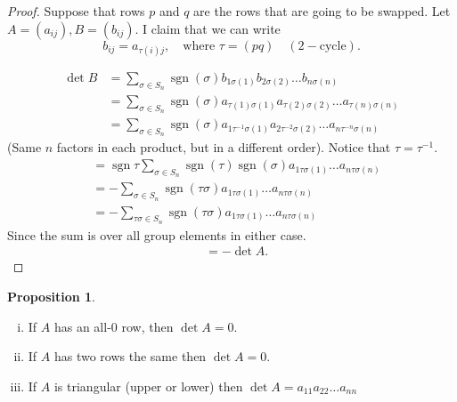 \documentclass{article}
\theoremstyle{definition} \newtheorem*{definition}{Definition}
\newtheorem{proposition}[theorem]{Proposition}
\DeclareMathOperator{\sgn}{sgn} \DeclareMathOperator{\id}{id}
\begin{document}
  \begin{proof} Suppose that rows $p$ and $q$ are the rows that are going to be
    swapped. Let $A=(a_{ij}),B=(b_{ij})$. I claim that we can write \[ b_{ij} =
    a_{\tau (i) j}, \quad\text{where }\tau = (pq) \quad (2-\text{cycle}).\]

      \begin{align*} \det B &= \sum_{\sigma \in S_n} \sgn(\sigma)
        b_{1\sigma(1)}b_{2\sigma (2)}\dots b_{n \sigma (n)}\\ &= \sum_{\sigma
        \in S_n} \sgn(\sigma) a_{\tau(1)\sigma(1)}a_{\tau(2)\sigma (2)}\dots
        a_{\tau(n) \sigma (n)}\\ &= \sum_{\sigma \in S_n} \sgn(\sigma)
        a_{1\tau^{-1}\sigma(1)}a_{2\tau^{-2}\sigma (2)}\dots a_{n\tau^{-n}
      \sigma (n)} \end{align*} (Same $n$ factors in each product, but in a
    different order). Notice that $\tau = \tau^{-1}$.  \begin{align*} &=
      \sgn{\tau} \sum_{\sigma \in
      S_n}\sgn(\tau)\sgn(\sigma)a_{1\tau\sigma(1)}\dots a_{n \tau\sigma(n)} \\
      &= - \sum_{\sigma \in S_n}\sgn(\tau\sigma)a_{1\tau\sigma(1)}\dots a_{n
      \tau\sigma(n)} \\ &= - \sum_{\tau\sigma \in
      S_n}\sgn(\tau\sigma)a_{1\tau\sigma(1)}\dots a_{n \tau\sigma(n)}
    \end{align*} Since the sum is over all group elements in either case.
    \begin{align*} &= -\det A.  \end{align*} \end{proof}

  \begin{proposition}\hfill \label{prp:rowssame} \begin{enumerate}[(i)] \item If $A$
          has an all-0 row, then $\det A=0$.  \item If $A$ has two rows the
          same then $\det A=0$.  \item If $A$ is triangular (upper or lower)
            then $\det A=a_{11}a_{22}\dots a_{nn}$ \end{enumerate}


  \end{proposition}
\end{document}
